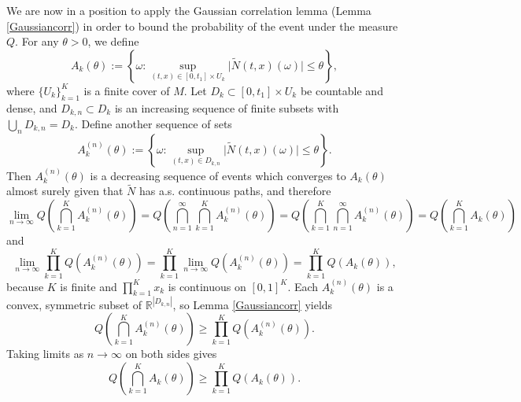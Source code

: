 \documentclass[12pt]{amsart}
\numberwithin{equation}{section}
\newcommand{\R}{\mathbb{R}}
\newcommand{\1}{\mathbf{1}}
\begin{document}
We are now in a position to apply the Gaussian correlation lemma (Lemma \ref{Gaussiancorr}) in order to bound the probability of the event under the measure $Q$. For any $\theta>0$, we define
\begin{equation*}
A_k(\theta):=\left\lbrace\omega:\sup_{(t,x)\in[0,t_1]\times U_k}\vert \widetilde{N}(t,x)(\omega)\vert\leq\theta\right\rbrace,
\end{equation*}
where $\{U_k\}_{k=1}^K$ is a finite cover of $M$. Let $D_k\subset[0,t_1]\times U_k$ be countable and dense, and $D_{k,n}\subset D_k$ is an increasing sequence of finite subsets with $\bigcup\limits_n D_{k,n}=D_k$. Define another sequence of sets
\begin{equation*}
A^{(n)}_k(\theta):=\left\lbrace\omega:\sup_{(t,x)\in D_{k,n}}\vert \widetilde{N}(t,x)(\omega)\vert\leq\theta\right\rbrace.
\end{equation*}
Then $A_k^{(n)}(\theta)$ is a decreasing sequence of events which converges to $A_k(\theta)$ almost surely given that $\widetilde{N}$ has a.s. continuous paths, and therefore
\begin{equation*}
\lim_{n\to\infty}Q\left(\bigcap_{k=1}^KA^{(n)}_k(\theta)\right)=Q\left(\bigcap_{n=1}^\infty\bigcap_{k=1}^KA^{(n)}_k(\theta)\right)=Q\left(\bigcap_{k=1}^K\bigcap_{n=1}^\infty A^{(n)}_k(\theta)\right)= Q\left(\bigcap_{k=1}^KA_k(\theta)\right)
\end{equation*}
and
\begin{equation*}
\lim_{n\to\infty}\prod_{k=1}^KQ\left(A_k^{(n)}(\theta)\right)=\prod_{k=1}^K\lim_{n\to\infty}Q\left(A_k^{(n)}(\theta)\right)=\prod_{k=1}^KQ\left(A_k(\theta)\right),
\end{equation*}
because $K$ is finite and $\prod_{k=1}^Kx_k$ is continuous on $[0,1]^K$. Each $A_k^{(n)}(\theta)$ is a convex, symmetric subset of $\R^{|D_{k,n}|}$, so Lemma \ref{Gaussiancorr} yields
\begin{equation*}
Q\left(\bigcap_{k=1}^KA^{(n)}_{k}(\theta)\right)\geq\prod_{k=1}^KQ\left(A^{(n)}_k(\theta)\right).
\end{equation*}
Taking limits as $n\to\infty$ on both sides gives
\begin{equation}
\label{Gaussiancorrmani}
Q\left(\bigcap_{k=1}^KA_k(\theta)\right)\geq\prod_{k=1}^KQ(A_k(\theta)).
\end{equation}
\end{document}
